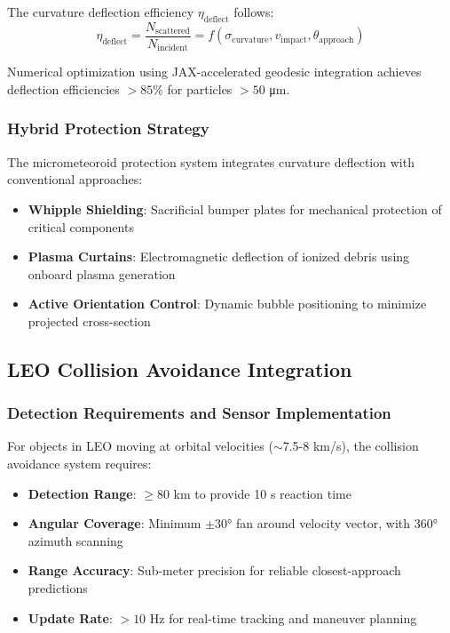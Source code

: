 The curvature deflection efficiency $\eta_{\text{deflect}}$ follows:
\begin{equation}
\eta_{\text{deflect}} = \frac{N_{\text{scattered}}}{N_{\text{incident}}} = f(\sigma_{\text{curvature}}, v_{\text{impact}}, \theta_{\text{approach}})
\end{equation}

Numerical optimization using JAX-accelerated geodesic integration achieves deflection efficiencies $>85\%$ for particles $>50$ μm.

\subsubsection{Hybrid Protection Strategy}
The micrometeoroid protection system integrates curvature deflection with conventional approaches:
\begin{itemize}
\item \textbf{Whipple Shielding}: Sacrificial bumper plates for mechanical protection of critical components
\item \textbf{Plasma Curtains}: Electromagnetic deflection of ionized debris using onboard plasma generation
\item \textbf{Active Orientation Control}: Dynamic bubble positioning to minimize projected cross-section
\end{itemize}

\subsection{LEO Collision Avoidance Integration}

\subsubsection{Detection Requirements and Sensor Implementation}
For objects in LEO moving at orbital velocities ($\sim$7.5-8 km/s), the collision avoidance system requires:
\begin{itemize}
\item \textbf{Detection Range}: $\geq 80$ km to provide 10 s reaction time
\item \textbf{Angular Coverage}: Minimum $\pm 30°$ fan around velocity vector, with 360° azimuth scanning
\item \textbf{Range Accuracy}: Sub-meter precision for reliable closest-approach predictions
\item \textbf{Update Rate}: $>10$ Hz for real-time tracking and maneuver planning
\end{itemize}

